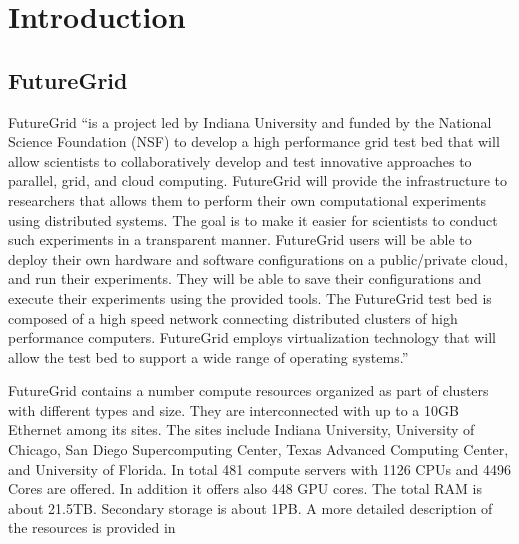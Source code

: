 \documentclass{tex/sig-alternate}
\begin{document}
 
 

\section{Introduction}

\subsection{FutureGrid}



FutureGrid \cite{las2010gce,las12fg-bookchapter} ``is a project led by
Indiana University and funded by the National Science Foundation (NSF)
to develop a high performance grid test bed that will allow scientists
to collaboratively develop and test innovative approaches to parallel,
grid, and cloud computing. FutureGrid will provide the infrastructure
to researchers that allows them to perform their own computational
experiments using distributed systems. The goal is to make it easier
for scientists to conduct such experiments in a transparent manner.
FutureGrid users will be able to deploy their own hardware and
software configurations on a public/private cloud, and run their
experiments. They will be able to save their configurations and
execute their experiments using the provided tools. The FutureGrid
test bed is composed of a high speed network connecting distributed
clusters of high performance computers. FutureGrid employs
virtualization technology that will allow the test bed to support a
wide range of operating systems.''



FutureGrid contains a number compute resources organized as part of
clusters with different types and size. They are interconnected with up to a 10GB Ethernet among its sites. The sites include Indiana University, University of Chicago, San Diego Supercomputing Center, Texas Advanced Computing Center, and University of Florida.
In total 481 compute servers with 1126 CPUs and 4496 Cores are
offered. In addition it offers also 448 GPU cores. The total RAM is
about 21.5TB. Secondary storage is about 1PB. A more detailed
description of the resources is provided in
\cite{vonLaszewski-bigdata-bookchapter2014}
\end{document}
